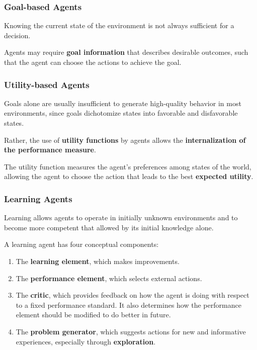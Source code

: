 \subsubsection{Goal-based Agents}

Knowing the current state of the environment is not always sufficient for a decision.

Agents may require \textbf{goal information} that describes desirable outcomes, such that the agent can choose the actions to achieve the goal.


\subsubsection{Utility-based Agents}

Goals alone are usually insufficient to generate high-quality behavior in most environments, since goals dichotomize states into favorable and disfavorable states.

Rather, the use of \textbf{utility functions} by agents allows the \textbf{internalization of the performance measure}.

The utility function measures the agent's preferences among states of the world, allowing the agent to choose the action that leads to the best \textbf{expected utility}.


\subsubsection{Learning Agents}

Learning allows agents to operate in initially unknown environments and to become more competent that allowed by its initial knowledge alone.

A learning agent has four conceptual components:

\begin{enumerate}
    \item The \textbf{learning element}, which makes improvements.
    \item The \textbf{performance element}, which selects external actions.
    \item The \textbf{critic}, which provides feedback on how the agent is doing with respect to a fixed performance standard. It also determines how the performance element should be modified to do better in future.
    \item The \textbf{problem generator}, which suggests actions for new and informative experiences, especially through \textbf{exploration}.
\end{enumerate}


